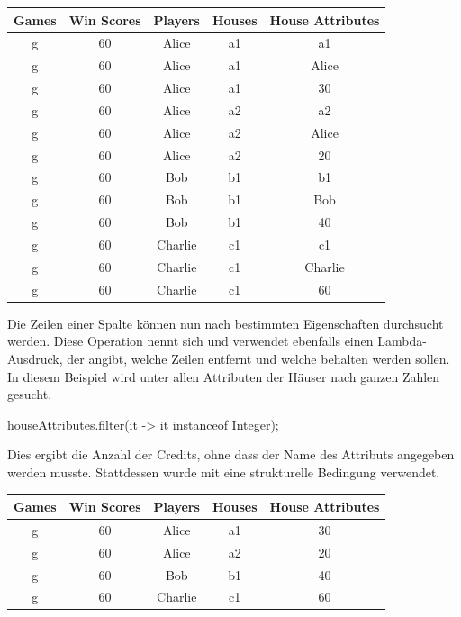 \begin{tabular}{|c|c|c|c|c|}
    \hline
    \textbf{Games} & \textbf{Win Scores} & \textbf{Players} & \textbf{Houses} & \textbf{House Attributes} \\
    \hline
    g & 60 & Alice   & a1 & a1      \\
    g & 60 & Alice   & a1 & Alice   \\
    g & 60 & Alice   & a1 & 30      \\
    g & 60 & Alice   & a2 & a2      \\
    g & 60 & Alice   & a2 & Alice   \\
    g & 60 & Alice   & a2 & 20      \\
    g & 60 & Bob     & b1 & b1      \\
    g & 60 & Bob     & b1 & Bob     \\
    g & 60 & Bob     & b1 & 40      \\
    g & 60 & Charlie & c1 & c1      \\
    g & 60 & Charlie & c1 & Charlie \\
    g & 60 & Charlie & c1 & 60      \\
    \hline
\end{tabular}

Die Zeilen einer Spalte können nun nach bestimmten Eigenschaften durchsucht werden.
Diese Operation nennt sich  und verwendet ebenfalls einen Lambda-Ausdruck,
der angibt, welche Zeilen entfernt und welche behalten werden sollen.
In diesem Beispiel wird unter allen Attributen der Häuser nach ganzen Zahlen gesucht.

\begin{jcodeblock}
    houseAttributes.filter(it -> it instanceof Integer);
\end{jcodeblock}

Dies ergibt die Anzahl der Credits, ohne dass der Name des Attributs angegeben werden musste.
Stattdessen wurde mit  eine strukturelle Bedingung verwendet.

\begin{tabular}{|c|c|c|c|c|}
    \hline
    \textbf{Games} & \textbf{Win Scores} & \textbf{Players} & \textbf{Houses} & \textbf{House Attributes} \\
    \hline
    g & 60 & Alice   & a1 & 30      \\
    g & 60 & Alice   & a2 & 20      \\
    g & 60 & Bob     & b1 & 40      \\
    g & 60 & Charlie & c1 & 60      \\
    \hline
\end{tabular}

